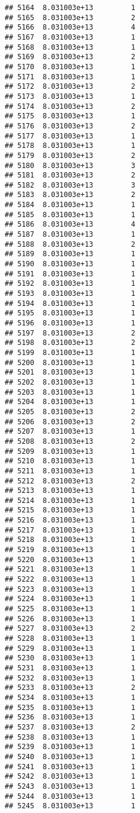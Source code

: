 \documentclass[
]{article}
\begin{document}
\begin{verbatim}
## 5164  8.031003e+13         1
## 5165  8.031003e+13         2
## 5166  8.031003e+13         4
## 5167  8.031003e+13         1
## 5168  8.031003e+13         1
## 5169  8.031003e+13         2
## 5170  8.031003e+13         1
## 5171  8.031003e+13         1
## 5172  8.031003e+13         2
## 5173  8.031003e+13         1
## 5174  8.031003e+13         2
## 5175  8.031003e+13         1
## 5176  8.031003e+13         2
## 5177  8.031003e+13         1
## 5178  8.031003e+13         1
## 5179  8.031003e+13         2
## 5180  8.031003e+13         3
## 5181  8.031003e+13         2
## 5182  8.031003e+13         3
## 5183  8.031003e+13         2
## 5184  8.031003e+13         1
## 5185  8.031003e+13         1
## 5186  8.031003e+13         4
## 5187  8.031003e+13         1
## 5188  8.031003e+13         2
## 5189  8.031003e+13         1
## 5190  8.031003e+13         1
## 5191  8.031003e+13         1
## 5192  8.031003e+13         1
## 5193  8.031003e+13         1
## 5194  8.031003e+13         1
## 5195  8.031003e+13         1
## 5196  8.031003e+13         1
## 5197  8.031003e+13         2
## 5198  8.031003e+13         2
## 5199  8.031003e+13         1
## 5200  8.031003e+13         1
## 5201  8.031003e+13         1
## 5202  8.031003e+13         1
## 5203  8.031003e+13         1
## 5204  8.031003e+13         1
## 5205  8.031003e+13         2
## 5206  8.031003e+13         2
## 5207  8.031003e+13         1
## 5208  8.031003e+13         2
## 5209  8.031003e+13         1
## 5210  8.031003e+13         1
## 5211  8.031003e+13         1
## 5212  8.031003e+13         2
## 5213  8.031003e+13         1
## 5214  8.031003e+13         1
## 5215  8.031003e+13         1
## 5216  8.031003e+13         1
## 5217  8.031003e+13         1
## 5218  8.031003e+13         1
## 5219  8.031003e+13         1
## 5220  8.031003e+13         1
## 5221  8.031003e+13         1
## 5222  8.031003e+13         1
## 5223  8.031003e+13         1
## 5224  8.031003e+13         1
## 5225  8.031003e+13         1
## 5226  8.031003e+13         1
## 5227  8.031003e+13         2
## 5228  8.031003e+13         1
## 5229  8.031003e+13         1
## 5230  8.031003e+13         1
## 5231  8.031003e+13         1
## 5232  8.031003e+13         1
## 5233  8.031003e+13         2
## 5234  8.031003e+13         1
## 5235  8.031003e+13         1
## 5236  8.031003e+13         1
## 5237  8.031003e+13         2
## 5238  8.031003e+13         1
## 5239  8.031003e+13         1
## 5240  8.031003e+13         1
## 5241  8.031003e+13         1
## 5242  8.031003e+13         1
## 5243  8.031003e+13         1
## 5244  8.031003e+13         1
## 5245  8.031003e+13         1

\end{verbatim}
\end{document}
